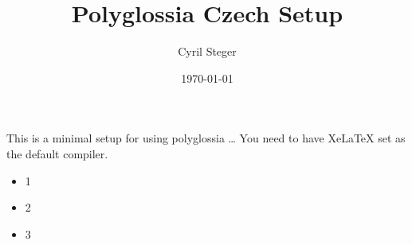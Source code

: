 \documentclass{article} %
\begin{document}
\title{Polyglossia Czech Setup}
\author{Cyril Steger}
\date{\today}

\maketitle %

This is a minimal setup for using polyglossia \dots
You need to have XeLaTeX set as the default compiler.

\begin{itemize}
    \item 1
    \item 2
    \item 3
\end{itemize}
\end{document}
